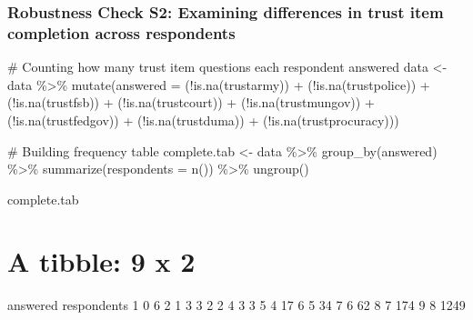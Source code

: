 \documentclass[
  letterpaper,
  DIV=11,
  numbers=noendperiod]{scrartcl}
\newenvironment{Shaded}{\begin{snugshade}}{\end{snugshade}}
\newcommand{\AttributeTok}[1]{\textcolor[rgb]{0.40,0.45,0.13}{#1}}
\newcommand{\CommentTok}[1]{\textcolor[rgb]{0.37,0.37,0.37}{#1}}
\newcommand{\FunctionTok}[1]{\textcolor[rgb]{0.28,0.35,0.67}{#1}}
\newcommand{\NormalTok}[1]{\textcolor[rgb]{0.00,0.23,0.31}{#1}}
\newcommand{\OtherTok}[1]{\textcolor[rgb]{0.00,0.23,0.31}{#1}}
\newcommand{\SpecialCharTok}[1]{\textcolor[rgb]{0.37,0.37,0.37}{#1}}
\begin{document}
\subsubsection{Robustness Check S2: Examining differences in trust item
completion across
respondents}\label{robustness-check-s2-examining-differences-in-trust-item-completion-across-respondents}

\begin{Shaded}
\begin{Highlighting}[]
\CommentTok{\# Counting how many trust item questions each respondent answered}
\NormalTok{data }\OtherTok{\textless{}{-}}\NormalTok{ data }\SpecialCharTok{\%\textgreater{}\%} 
  \FunctionTok{mutate}\NormalTok{(}\AttributeTok{answered =}\NormalTok{ (}\SpecialCharTok{!}\FunctionTok{is.na}\NormalTok{(trustarmy)) }\SpecialCharTok{+}\NormalTok{ (}\SpecialCharTok{!}\FunctionTok{is.na}\NormalTok{(trustpolice)) }\SpecialCharTok{+}
\NormalTok{           (}\SpecialCharTok{!}\FunctionTok{is.na}\NormalTok{(trustfsb)) }\SpecialCharTok{+}\NormalTok{ (}\SpecialCharTok{!}\FunctionTok{is.na}\NormalTok{(trustcourt)) }\SpecialCharTok{+}
\NormalTok{           (}\SpecialCharTok{!}\FunctionTok{is.na}\NormalTok{(trustmungov)) }\SpecialCharTok{+}\NormalTok{ (}\SpecialCharTok{!}\FunctionTok{is.na}\NormalTok{(trustfedgov)) }\SpecialCharTok{+}
\NormalTok{           (}\SpecialCharTok{!}\FunctionTok{is.na}\NormalTok{(trustduma)) }\SpecialCharTok{+}\NormalTok{ (}\SpecialCharTok{!}\FunctionTok{is.na}\NormalTok{(trustprocuracy)))}

\CommentTok{\# Building frequency table}
\NormalTok{complete.tab }\OtherTok{\textless{}{-}}\NormalTok{ data }\SpecialCharTok{\%\textgreater{}\%} 
  \FunctionTok{group\_by}\NormalTok{(answered) }\SpecialCharTok{\%\textgreater{}\%} 
  \FunctionTok{summarize}\NormalTok{(}\AttributeTok{respondents =} \FunctionTok{n}\NormalTok{()) }\SpecialCharTok{\%\textgreater{}\%} 
  \FunctionTok{ungroup}\NormalTok{()}

\NormalTok{complete.tab}
\end{Highlighting}
\end{Shaded}

\section{A tibble: 9 x 2}\label{a-tibble-9-x-2}

answered respondents 1 0 6 2 1 3 3 2 2 4 3 3 5 4 17 6 5 34 7 6 62 8 7
174 9 8 1249
\end{document}
